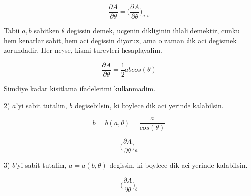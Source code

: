 \documentclass[12pt,fleqn]{article}
\begin{document}
\[ \frac{\partial A}{\partial \theta} = 
\bigg( \frac{\partial A}{\partial \theta} \bigg)_{a,b}  \]

Tabii $a,b$ sabitken $\theta$ degissin demek, ucgenin dikliginin ihlali
demektir, cunku hem kenarlar sabit, hem aci degissin diyoruz, ama o zaman
dik aci degismek zorundadir. Her neyse, kismi turevleri hesaplayalim. 

\[ \frac{\partial A}{\partial \theta} = \frac{1}{2}ab cos(\theta) \]

Simdiye kadar kisitlama ifadelerimi kullanmadim. 

2) $a$'yi sabit tutalim, $b$ degisebilsin, ki boylece dik aci yerinde
kalabilsin. 

\[ b = b(a,\theta) = \frac{a}{cos(\theta)} \]

\[ \bigg( \frac{\partial A}{\partial \theta} \bigg)_{a}  \]

3) $b$'yi sabit tutalim, $a = a(b,\theta)$ degissin, ki boylece dik aci yerinde
kalabilsin. 

\[ \bigg( \frac{\partial A}{\partial \theta} \bigg)_{b}  \]
\end{document}
